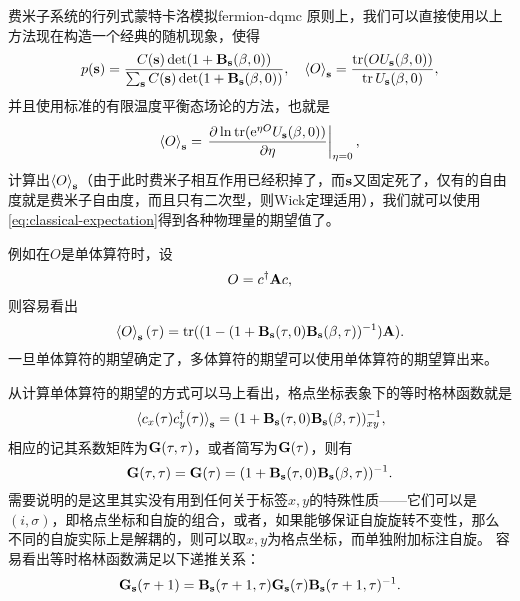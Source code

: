 \begin{back}{费米子系统的行列式蒙特卡洛模拟}{fermion-dqmc}
    原则上，我们可以直接使用以上方法现在构造一个经典的随机现象，使得
    \begin{equation}
        p(\vb{s}) = \frac{ C(\vb{s}) \det(1 + \vb{B}_{\vb{s}}(\beta, 0))}{\sum_{\vb{s}} C(\vb{s}) \det(1 + \vb{B}_{\vb{s}}(\beta, 0))}, \quad \expval{O}_{\vb{s}} = \frac{\trace({O} {U}_{\vb{s}}(\beta, 0))}{\trace {U}_{\vb{s}}(\beta, 0)},
        \label{eq:ftqmc-prob}
    \end{equation}
    并且使用标准的有限温度平衡态场论的方法，也就是
    \begin{equation}
        \expval{O}_{\vb{s}} = \eval{\pdv{\ln \trace(\ee^{\eta {O}} {U}_{\vb{s}}(\beta, 0))}{\eta}}_{\eta=0},
    \end{equation}
    计算出$\expval{O}_{\vb{s}}$（由于此时费米子相互作用已经积掉了，而$\vb{s}$又固定死了，仅有的自由度就是费米子自由度，而且只有二次型，则Wick定理适用），我们就可以使用\eqref{eq:classical-expectation}得到各种物理量的期望值了。

    例如在${O}$是单体算符时，设
    \begin{equation}
        {O} = {c}^\dagger \vb{A} {c},
    \end{equation}
    则容易看出
    \begin{equation}
        \expval{O}_{\vb{s}}(\tau) = \trace((1 - (1+ \vb{B}_{\vb{s}}(\tau, 0) \vb{B}_{\vb{s}}(\beta, \tau))^{-1}) \vb{A}).
    \end{equation}
    一旦单体算符的期望确定了，多体算符的期望可以使用单体算符的期望算出来。

    从计算单体算符的期望的方式可以马上看出，格点坐标表象下的等时格林函数就是
    \begin{equation}
        \expval*{{c}_x(\tau) {c}^\dagger_y(\tau)}_{\vb{s}} = (1+ \vb{B}_{\vb{s}}(\tau, 0) \vb{B}_{\vb{s}}(\beta, \tau))^{-1}_{xy},
    \end{equation}
    相应的记其系数矩阵为$\vb{G}(\tau, \tau)$，或者简写为$\vb{G}(\tau)$，则有
    \begin{equation}
        \vb{G}(\tau, \tau) = \vb{G}(\tau) = (1+ \vb{B}_{\vb{s}}(\tau, 0) \vb{B}_{\vb{s}}(\beta, \tau))^{-1}.
    \end{equation}
    需要说明的是这里其实没有用到任何关于标签$x, y$的特殊性质——它们可以是$(i, \sigma)$，即格点坐标和自旋的组合，或者，如果能够保证自旋旋转不变性，那么不同的自旋实际上是解耦的，则可以取$x, y$为格点坐标，而单独附加标注自旋。
    容易看出等时格林函数满足以下递推关系：
    \begin{equation}
        \vb{G}_{\vb{s}}(\tau + 1) = \vb{B}_{\vb{s}}(\tau+1, \tau) \vb{G}_{\vb{s}}(\tau) \vb{B}_{\vb{s}}(\tau+1, \tau)^{-1}.
        \label{eq:eq-time-green-function-iter}
    \end{equation}


\end{back}

